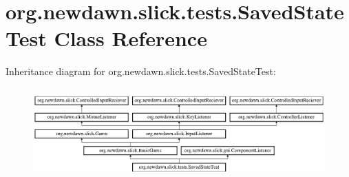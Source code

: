 \hypertarget{classorg_1_1newdawn_1_1slick_1_1tests_1_1_saved_state_test}{}\section{org.\+newdawn.\+slick.\+tests.\+Saved\+State\+Test Class Reference}
\label{classorg_1_1newdawn_1_1slick_1_1tests_1_1_saved_state_test}
Inheritance diagram for org.\+newdawn.\+slick.\+tests.\+Saved\+State\+Test\+:\begin{figure}[H]
\begin{center}
\leavevmode
\includegraphics[height=3.522012cm]{classorg_1_1newdawn_1_1slick_1_1tests_1_1_saved_state_test}
\end{center}
\end{figure}
